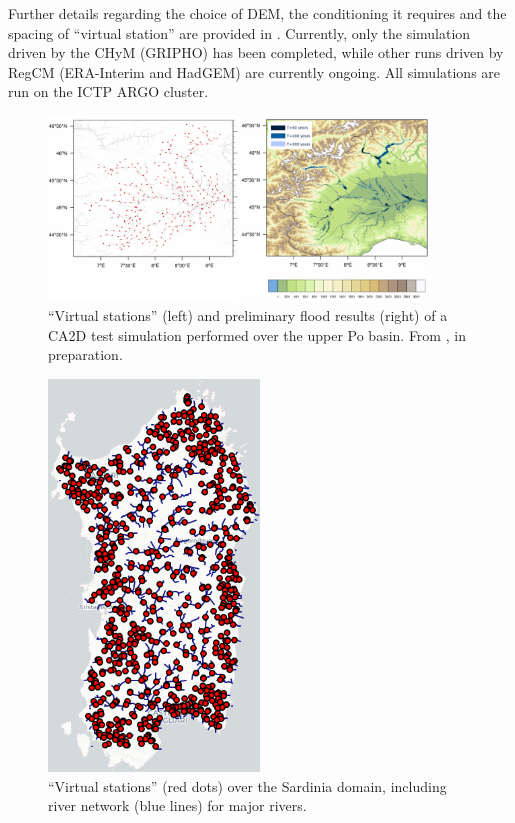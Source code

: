 Further details regarding the choice of DEM, the conditioning it requires and the spacing of ``virtual station'' are provided in \citet[][in preparation]{nogherotto2019}.
Currently, only the simulation driven by the CHyM (GRIPHO) has been completed, while other runs driven by RegCM (ERA-Interim and HadGEM) are currently ongoing.
All simulations are run on the ICTP ARGO cluster.
\begin{figure}
    \centering
    \includegraphics[width=0.9\textwidth]{figures/valid_flood/overlay_chym_locations.png}
    \decoRule
    \caption[``Virtual stations'' and preliminary results of a CA2D simulations over the upper Po basin]{``Virtual stations'' (left) and preliminary flood results (right) of a CA2D test simulation performed over the upper Po basin. From \citet{nogherotto2019}, in preparation.}
    \label{fig:ca2d_fakestations}
\end{figure}
\begin{figure}
    \centering
    \includegraphics[width=0.5\textwidth]{figures/valid_flood/method/Sardinia}
    \decoRule
    \caption[``Virtual stations'' example over the Sardinia domain]{``Virtual stations'' (red dots) over the Sardinia domain, including river network (blue lines) for major rivers.}
    \label{fig:ca2d_fakestations2}
\end{figure}

